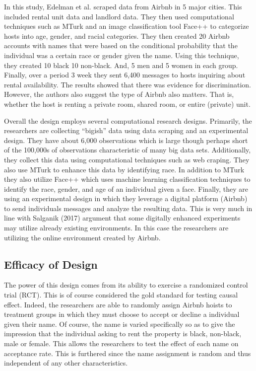 \documentclass[dvips,12pt]{article}
\begin{document}
In this study, Edelman et al. scraped data from Airbnb in 5 major cities. This included rental unit data and landlord data. They then used computational techniques such as MTurk and an image classification tool Face++ to categorize hosts into age, gender, and racial categories. They then created 20 Airbnb accounts with names that were based on the conditional probability that the individual was a certain race or gender given the name. Using this technique, they created 10 black 10 non-black. And, 5 men and 5 women in each group.  Finally, over a period 3 week they sent 6,400 messages to hosts inquiring about rental availability. The results showed that there was evidence for discrimination. However, the authors also suggest the type of Airbnb also matters. That is, whether the host is renting a private room, shared room, or entire (private) unit.

Overall the design employs several computational research designs. Primarily, the researchers are collecting “bigish” data using data scraping and an experimental design. They have about 6,000 observations which is large though perhaps short of the 100,000s of observations characteristic of many big data sets. Additionally, they collect this data using computational techniques such as web craping. They also use MTurk to enhance this data by identifying race. In addition to MTurk they also utilize Face++ which uses machine learning classification techniques to identify the race, gender, and age of an individual given a face. Finally, they are using an experimental design in which they leverage a digital platform (Airbnb) to send individuals messages and analyze the resulting data. This is very much in line with Salganik (2017) argument that some digitally enhanced experiments may utilize already existing environments. In this case the researchers are utilizing the online environment created by Airbnb.  

\subsection{Efficacy of Design}
The power of this design comes from its ability to exercise a randomized control trial (RCT). This is of course considered the gold standard for testing causal effect. Indeed, the researchers are able to randomly assign Airbnb hoists to treatment groups in which they must choose to accept or decline a individual given their name. Of course, the name is varied specifically so as to give the impression that the individual asking to rent the property is black, non-black, male or female. This allows the researchers to test the effect of each name on acceptance rate. This is furthered since the name assignment is random and thus independent of any other characteristics. 
\end{document}
